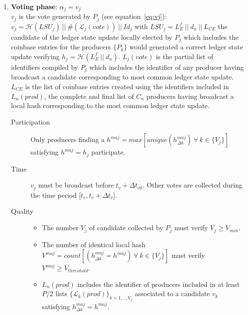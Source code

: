 \begin{enumerate}
\item \textbf{Voting phase}: $\alpha_j = v_j$\\
$v_j$ is the vote generated by $P_j$ (see equation~\ref{eq:vj}): $v_j = \mathcal{H}(LSU_j)~||~\#(\mathcal{L}_j(vote))~||~Id_j$ with $LSU_j = L^f_E~||~d_n~||~L_{CE}$ the candidate of the ledger state update locally elected by $P_j$ which includes the coinbase entries for the producers $\{P_k\}$ would generated a correct ledger state update verifying $h_j = \mathcal{H}(L^f_E~||~d_n)$. $L_j(vote)$ is the partial list of identifiers compiled by $P_j$ which includes the identifier of any producer having broadcast a candidate corresponding to most common ledger state update. $L_{CE}$ is the list of coinbase entries created using the identifiers included in $L_n(prod)$, the complete and final list of $C_n$ producers having broadcast a local hash corresponding to the most common ledger state update.  
\begin{description}
\item[Participation] Only producers finding a $h^{maj} = max[unique(h^{maj}_{\Delta k})~\forall~k\in\{V_j\}]$ satisfying $h^{maj} = h_j$ participate.
\item[Time] $v_j$ must be broadcast before $t_v + \Delta t_{v0}$. Other votes are collected during the time period [$t_v, t_v + \Delta t_{v}$].
\item[Quality] 
\begin{itemize}
\item The number $V_j$ of candidate collected by $P_j$ must verify $V_j \geq V_{min}$.
\item The number of identical local hash $V^{maj} = count[(h^{maj}_{\Delta k} = h^{maj})~\forall~k\in\{V_j\}]$ must verify $V^{maj} \geq V_{threshold}$.
\item $L_n(prod)$ includes the identifier of producers included in at least $P/2$ lists $\{\mathcal{L}_{k}(prod)\}_{k=1,..,V_j}$ associated to a candidate $v_{k}$ satisfying $h^{maj}_{\Delta k} = h^{maj}$.
\end{itemize}
\end{description}


\end{enumerate}
